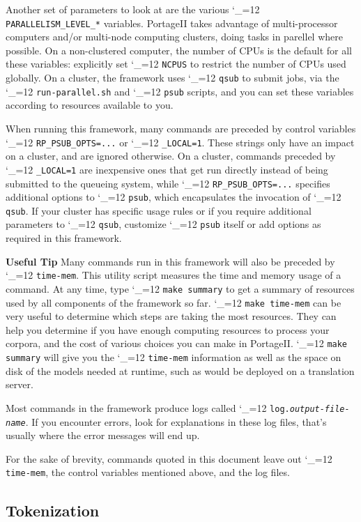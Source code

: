 \documentclass[11pt,letterpaper]{article}
\newcommand{\PS}{PortageII\xspace}
\def\code{\begingroup\catcode`\_=12 \codex}
\newcommand{\codex}[1]{\texttt{#1}\endgroup}
\newcommand{\tip}{\textbf{Useful Tip \large{\ding{43}} }}
\newcommand{\margintip}{\marginpar[{\textbf{Tip \large{\ding{43}}}}]{\textbf{\reflectbox{\large{\ding{43}}} Tip}}}
\newcommand{\tipend}{\textbf{ \reflectbox{\large{\ding{43}}}}}
\begin{document}
Another set of parameters to look at are the various
\code{PARALLELISM_LEVEL_*} variables.  \PS takes
advantage of multi-processor computers and/or multi-node computing clusters,
doing tasks in parellel where possible.  On a non-clustered computer,
the number of CPUs is the default for all these variables:
explicitly set \code{NCPUS} to restrict the number of CPUs used globally.
On a cluster, the framework uses
\code{qsub} to submit jobs, via the \code{run-parallel.sh} and \code{psub}
scripts, and you can set these variables according to resources available to
you.

When running this framework, many commands are preceded
by control variables \code{RP_PSUB_OPTS=...} or \code{_LOCAL=1}.  These strings
only have an impact on a cluster, and are ignored otherwise.
On a cluster, commands preceded by \code{_LOCAL=1} are inexpensive ones
that get run directly instead of being submitted to the queueing system, while
\code{RP_PSUB_OPTS=...} specifies additional options to \code{psub},
which encapsulates the invocation of \code{qsub}.  If your
cluster has specific usage rules or if you require additional parameters to
\code{qsub}, customize \code{psub} itself or add options as
required in this framework.

\tip\margintip Many commands run in this framework will also be preceded by
\code{time-mem}. This utility script measures the time and memory usage of a
command.  At any time, type \code{make summary} to get a summary of resources
used by all components of the framework so far.  \code{make
time-mem} can be very useful to determine which steps are taking the most
resources.  They can help you determine if you have enough
computing resources to process your corpora, and
the cost of various choices you can make in \PS.  \code{make
summary} will give you the \code{time-mem} information as well as the space on
disk of the models needed at runtime, such as would be deployed on a
translation server.\tipend

Most commands in the framework produce logs called
\code{log.\emph{output-file-name}}.  If you encounter errors, look for
explanations in these log files, that's usually where the error messages will
end up.

For the sake of brevity, commands quoted in this document
leave out \code{time-mem}, the control
variables mentioned above, and the log files.

\subsection{Tokenization} \label{Tokenizing}
\end{document}
